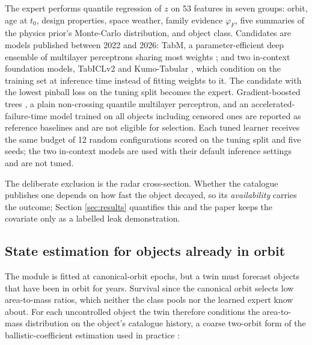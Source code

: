 \documentclass[3p,times,twocolumn]{elsarticle}
\begin{document}
The expert performs quantile regression of \(z\) on 53 features in seven
groups: orbit, age at \(t_0\), design properties, space weather, family
evidence \(\varphi_F\), five summaries of the physics prior's
Monte-Carlo distribution, and object class. Candidates are models
published between 2022 and 2026: TabM, a parameter-efficient deep
ensemble of multilayer perceptrons sharing most weights
\citep{gorishniy2025tabm}; and two in-context foundation models,
TabICLv2 \citep{qu2025tabicl, qu2026tabiclv2} and Kumo-Tabular
\citep{nvidia2026kumo}, which condition on the training set at inference
time instead of fitting weights to it. The candidate with the lowest
pinball loss on the tuning split becomes the expert. Gradient-boosted
trees
\citep{chen2016xgboost, ke2017lightgbm, prokhorenkova2018catboost}, a
plain non-crossing quantile multilayer perceptron, and an
accelerated-failure-time model trained on all objects including censored
ones \citep{barnwal2022survival} are reported as reference baselines and
are not eligible for selection. Each tuned learner receives the same
budget of 12 random configurations scored on the tuning split and five
seeds; the two in-context models are used with their default inference
settings and are not tuned.

The deliberate exclusion is the radar cross-section. Whether the
catalogue publishes one depends on how fast the object decayed, so its
\emph{availability} carries the outcome; Section \ref{sec:results}
quantifies this and the paper keeps the covariate only as a labelled
leak demonstration.

\subsection{State estimation for objects already in
orbit}\label{state-estimation-for-objects-already-in-orbit}

The module is fitted at canonical-orbit epochs, but a twin must forecast
objects that have been in orbit for years. Survival since the canonical
orbit selects low area-to-mass ratios, which neither the class pools nor
the learned expert know about. For each uncontrolled object the twin
therefore conditions the area-to-mass distribution on the object's
catalogue history, a coarse two-orbit form of the ballistic-coefficient
estimation used in practice
\citep{gondelach2017ballistic, sang2013estimation, pardini2008impact}:
\end{document}
